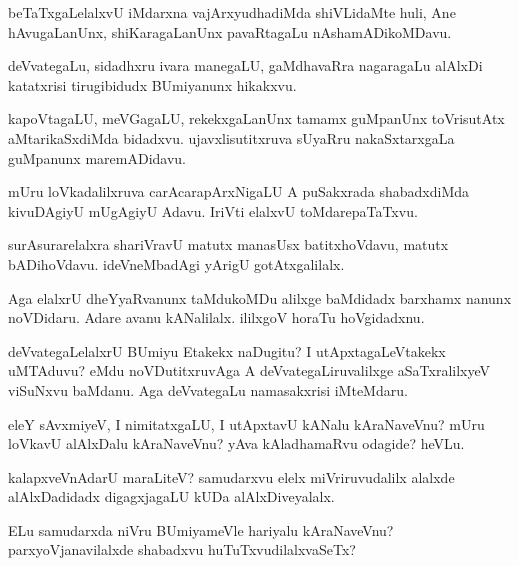 \documentclass{article}
\begin{document}
\begin{mn}
beTaTxgaLelalxvU iMdarxna vajArxyudhadiMda shiVLidaMte huli, Ane
hAvugaLanUnx, shiKaragaLanUnx pavaRtagaLu nAshamADikoMDavu.
\end{mn}

\begin{mn}
deVvategaLu, sidadhxru ivara manegaLU, gaMdhavaRra nagaragaLu alAlxDi
katatxrisi tirugibidudx BUmiyanunx hikakxvu.
\end{mn}

\begin{mn}%
kapoVtagaLU, meVGagaLU, rekekxgaLanUnx tamamx guMpanUnx toVrisutAtx
aMtarikaSxdiMda bidadxvu. ujavxlisutitxruva sUyaRru nakaSxtarxgaLa
guMpanunx maremADidavu.
\end{mn}

\begin{mn}
mUru loVkadalilxruva carAcarapArxNigaLU A puSakxrada shabadxdiMda
kivuDAgiyU mUgAgiyU Adavu. IriVti elalxvU toMdarepaTaTxvu.
\end{mn}

\begin{mn}
surAsurarelalxra shariVravU matutx manasUsx batitxhoVdavu, matutx
bADihoVdavu. ideVneMbadAgi yArigU gotAtxgalilalx.
\end{mn}

\begin{mn}
Aga elalxrU dheYyaRvanunx taMdukoMDu alilxge baMdidadx barxhamx nanunx
noVDidaru. Adare avanu kANalilalx. ililxgoV horaTu hoVgidadxnu.
\end{mn}

\begin{mn}
deVvategaLelalxrU BUmiyu Etakekx naDugitu? I utApxtagaLeVtakekx
uMTAduvu? eMdu noVDutitxruvAga A deVvategaLiruvalilxge aSaTxralilxyeV
viSuNxvu baMdanu. Aga deVvategaLu namasakxrisi iMteMdaru.
\end{mn}

\begin{mn}
eleY sAvxmiyeV, I nimitatxgaLU, I utApxtavU kANalu kAraNaveVnu? mUru
loVkavU alAlxDalu kAraNaveVnu? yAva kAladhamaRvu odagide? heVLu.
\end{mn}

\begin{mn}
kalapxveVnAdarU maraLiteV? samudarxvu elelx miVriruvudalilx alalxde
alAlxDadidadx digagxjagaLU kUDa alAlxDiveyalalx.
\end{mn}

\begin{mn}
ELu samudarxda niVru BUmiyameVle hariyalu kAraNaveVnu?
parxyoVjanavilalxde shabadxvu huTuTxvudilalxvaSeTx?
\end{mn}
\end{document}
